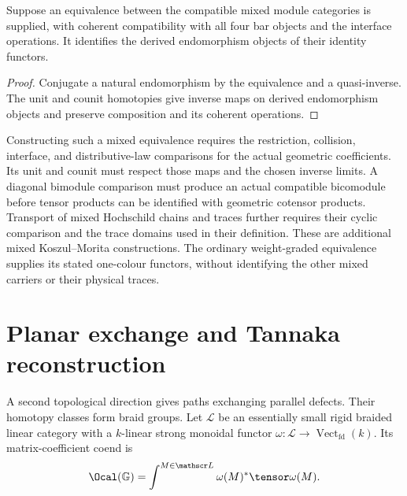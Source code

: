 \begin{proposition}
Suppose an equivalence between the compatible mixed module categories is supplied,
with coherent compatibility with all four bar objects and the interface operations.
It identifies the derived endomorphism objects of their identity functors.
\end{proposition}
\begin{proof}
Conjugate a natural endomorphism by the equivalence and a quasi-inverse.
The unit and counit homotopies give inverse maps on derived endomorphism objects
and preserve composition and its coherent operations.
\end{proof}

Constructing such a mixed equivalence requires the restriction, collision,
interface, and distributive-law comparisons for the actual geometric coefficients.
Its unit and counit must respect those maps and the chosen inverse limits.
A diagonal bimodule comparison must produce an actual compatible bicomodule
before tensor products can be identified with geometric cotensor products.
Transport of mixed Hochschild chains and traces further requires their
cyclic comparison and the trace domains used in their definition.
These are additional mixed Koszul--Morita constructions.
The ordinary weight-graded equivalence supplies its stated one-colour functors,
without identifying the other mixed carriers or their physical traces.

\chapter{Planar exchange and Tannaka reconstruction}
A second topological direction gives paths exchanging parallel defects.
Their homotopy classes form braid groups.
Let $\mathscr L$ be an essentially small rigid braided linear category
with a $k$-linear strong monoidal functor
$\omega:\mathscr L\to\operatorname{Vect}_{\mathrm{fd}}(k)$.
Its matrix-coefficient coend is
\[
 \Ocal(\mathbb G)=\int^{M\in\mathscr L}\omega(M)^*\tensor\omega(M).
\]

